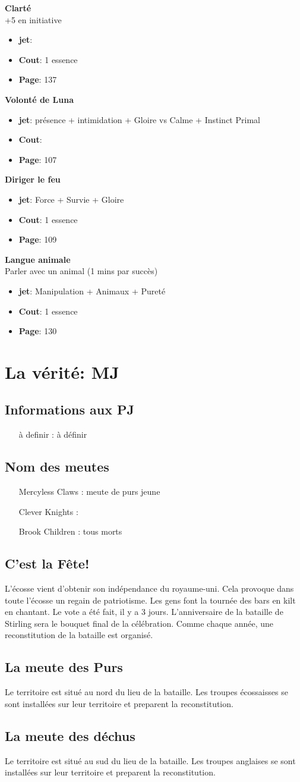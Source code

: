 \documentclass[oneside,12pt]{book}
\newcommand\don[5]{
\textbf{#1} \\
#2
\begin{itemize}
\item{ \textbf{jet}: #3}
\item{ \textbf{Cout}: #4}
\item{ \textbf{Page}: #5}
\end{itemize}
\vspace{0.5cm}
}
\begin{document}
\begin{flushleft}
\don{Clarté}{+5 en initiative}{}{1 essence}{137}
\don{Volonté de Luna}{}{présence + intimidation + Gloire vs Calme + Instinct Primal}{}{107}
\don{Diriger le feu}{}{Force + Survie + Gloire}{1 essence}{109}
\don{Langue animale}{Parler avec un animal (1 mins par succès)}{Manipulation + Animaux + Pureté}{1 essence}{130}

\chapter{La vérité: MJ}
\section{Informations aux PJ}
\begin{itemize}
\item[à definir]: à définir
\end{itemize}

\section{Nom des meutes}
\begin{itemize}
\item[Mercyless Claws]: meute de purs jeune
\item[Clever Knights]: 
\item[Brook Children]: tous morts
\end{itemize}


\section{C'est la Fête!}
L'écosse vient d'obtenir son indépendance du royaume-uni. Cela provoque dans toute l'écosse un regain de patriotisme. Les gens font la tournée des bars en kilt en chantant.
Le vote a été fait, il y a 3 jours. L'anniversaire de la bataille de Stirling sera le bouquet final de la célébration. Comme chaque année, une reconstitution de la bataille est organisé. 


\section{La meute des Purs}
Le territoire est situé au nord du lieu de la bataille. Les troupes écossaisses se sont installées sur leur territoire et preparent la reconstitution.

\section{La meute des déchus}
Le territoire est situé au sud du lieu de la bataille. Les troupes anglaises se sont installées sur leur territoire et preparent la reconstitution.



\end{flushleft}
\end{document}
